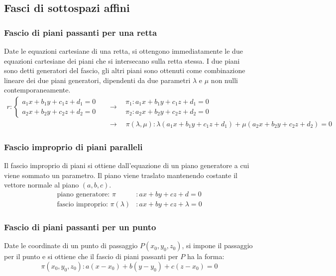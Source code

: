 \documentclass[a4paper]{article}
\begin{document}
\subsection{Fasci di sottospazi affini}
\subsubsection*{Fascio di piani passanti per una retta}
Date le equazioni cartesiane di una retta, si ottengono immediatamente le due equazioni cartesiane dei piani che si intersecano
sulla retta stessa. I due piani sono detti generatori del fascio, gli altri piani sono ottenuti come combinazione lineare dei
due piani generatori, dipendenti da due parametri \(\lambda\) e \(\mu\) non nulli contemporaneamente.
\begin{align*}
	r: \begin{cases}
		a_1 x + b_1 y + c_1 z + d_1 = 0 \\
		a_2 x + b_2 y + c_2 z + d_2 = 0
	\end{cases}
	\;\; &\longrightarrow \;\; \begin{aligned}
		\pi_1 : a_1 x + b_1 y + c_1 z + d_1 = 0 \\
		\pi_2 : a_2 x + b_2 y + c_2 z + d_2 = 0
	\end{aligned}
	\\ \quad &\longrightarrow \quad
	\pi(\lambda,\mu): \lambda (a_1 x + b_1 y + c_1 z + d_1) + \mu (a_2 x + b_2 y + c_2 z + d_2) = 0
\end{align*}

\subsubsection*{Fascio improprio di piani paralleli}
Il fascio improprio di piani si ottiene dall'equazione di un piano generatore a cui viene sommato un parametro. Il piano viene
traslato mantenendo costante il vettore normale al piano \((a,b,c)\).
\begin{align*}
	\text{piano generatore: } \pi &: ax + by + cz + d = 0 \\
	\text{fascio improprio: } \pi(\lambda) &: ax + by + cz + \lambda = 0
\end{align*}

\subsubsection*{Fascio di piani passanti per un punto}
Date le coordinate di un punto di passaggio \(P (x_0, y_0, z_0)\), si impone il passaggio per il punto e si ottiene che il fascio
di piani passanti per \(P\) ha la forma:
\[\pi(x_0,y_0,z_0): a(x-x_0) + b(y-y_0) + c(z-x_0) = 0\]
\end{document}
